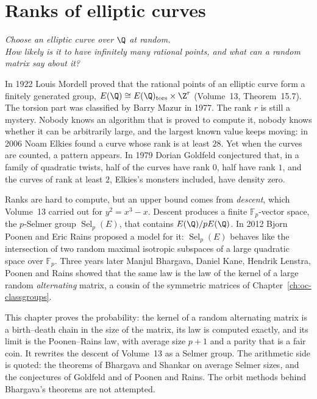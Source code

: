 \chapter{Ranks of elliptic curves}\label{ch:oc-ranks}

\begin{center}\itshape
Choose an elliptic curve over $\Q$ at random.\\
How likely is it to have infinitely many rational points, and what can a random matrix say about it?
\end{center}

In 1922 Louis Mordell proved that the rational points of an elliptic curve form a finitely generated group, $E(\Q)\cong E(\Q)_{\mathrm{tors}}\times\Z^r$ (Volume~13, Theorem~15.7). The torsion part was classified by Barry Mazur in 1977. The rank $r$ is still a mystery. Nobody knows an algorithm that is proved to compute it, nobody knows whether it can be arbitrarily large, and the largest known value keeps moving: in 2006 Noam Elkies found a curve whose rank is at least $28$. Yet when the curves are counted, a pattern appears. In 1979 Dorian Goldfeld conjectured that, in a family of quadratic twists, half of the curves have rank $0$, half have rank $1$, and the curves of rank at least $2$, Elkies's monsters included, have density zero.

Ranks are hard to compute, but an upper bound comes from \emph{descent}, which Volume~13 carried out for $y^2=x^3-x$. Descent produces a finite $\mathbb F_p$-vector space, the $p$-Selmer group $\operatorname{Sel}_p(E)$, that contains $E(\Q)/pE(\Q)$. In 2012 Bjorn Poonen and Eric Rains proposed a model for it: $\operatorname{Sel}_p(E)$ behaves like the intersection of two random maximal isotropic subspaces of a large quadratic space over $\mathbb F_p$. Three years later Manjul Bhargava, Daniel Kane, Hendrik Lenstra, Poonen and Rains showed that the same law is the law of the kernel of a large random \emph{alternating} matrix, a cousin of the symmetric matrices of Chapter~\ref{ch:oc-classgroups}.

This chapter proves the probability: the kernel of a random alternating matrix is a birth--death chain in the size of the matrix, its law is computed exactly, and its limit is the Poonen--Rains law, with average size $p+1$ and a parity that is a fair coin. It rewrites the descent of Volume~13 as a Selmer group. The arithmetic side is quoted: the theorems of Bhargava and Shankar on average Selmer sizes, and the conjectures of Goldfeld and of Poonen and Rains. The orbit methods behind Bhargava's theorems are not attempted.


